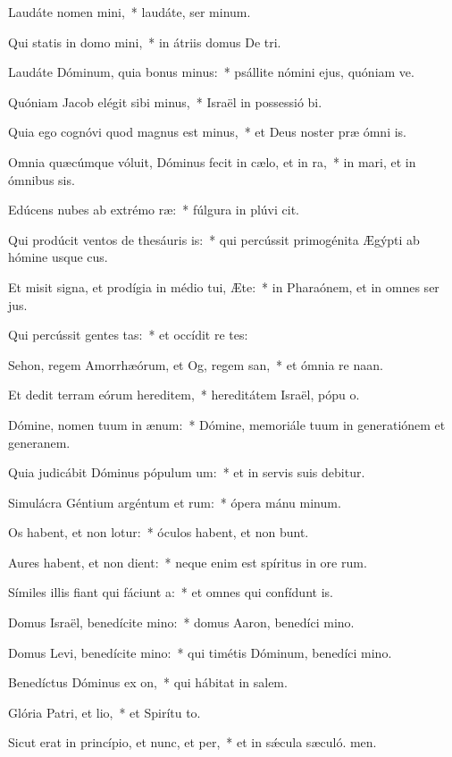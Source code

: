 \item Laudáte nomen mini,~* laudáte, ser minum.
\item Qui statis in domo mini,~* in átriis domus De tri.
\item Laudáte Dóminum, quia bonus minus:~* psállite nómini ejus, quóniam ve.
\item Quóniam Jacob elégit sibi minus,~* Israël in possessió bi.
\item Quia ego cognóvi quod magnus est minus,~* et Deus noster præ ómni is.
\item Omnia quæcúmque vóluit, Dóminus fecit in cælo, et in ra,~* in mari, et in ómnibus sis.
\item Edúcens nubes ab extrémo ræ:~* fúlgura in plúvi cit.
\item Qui prodúcit ventos de thesáuris is:~* qui percússit primogénita Ægýpti ab hómine usque  cus.
\item Et misit signa, et prodígia in médio tui, Æte:~* in Pharaónem, et in omnes ser jus.
\item Qui percússit gentes tas:~* et occídit re tes:
\item Sehon, regem Amorrhæórum, et Og, regem san,~* et ómnia re naan.
\item Et dedit terram eórum hereditem,~* hereditátem Israël, pópu o.
\item Dómine, nomen tuum in ænum:~* Dómine, memoriále tuum in generatiónem et generanem.
\item Quia judicábit Dóminus pópulum um:~* et in servis suis debitur.
\item Simulácra Géntium argéntum et rum:~* ópera mánu minum.
\item Os habent, et non lotur:~* óculos habent, et non bunt.
\item Aures habent, et non dient:~* neque enim est spíritus in ore rum.
\item Símiles illis fiant qui fáciunt a:~* et omnes qui confídunt  is.
\item Domus Israël, benedícite mino:~* domus Aaron, benedíci mino.
\item Domus Levi, benedícite mino:~* qui timétis Dóminum, benedíci mino.
\item Benedíctus Dóminus ex on,~* qui hábitat in salem.
\item Glória Patri, et lio,~* et Spirítu to.
\item Sicut erat in princípio, et nunc, et per,~* et in sǽcula sæculó. men.
